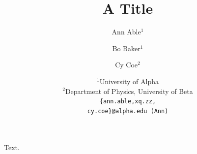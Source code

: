 \documentclass{article}
\title{A Title}
\author{%
  Ann Able$^{1}$ \\
  \and
  Bo Baker$^{1}$ \\
  \and
  Cy Coe$^{2}$ \\
  \and
 {\normalfont $^1$University of Alpha} \\
 {\normalfont $^2$Department of Physics, University of Beta} \\
 \texttt{\{ann.able,xq.zz,}\\
 \texttt{cy.coe\}@alpha.edu (Ann)}
}
\begin{document}
\maketitle
Text.
\end{document}
